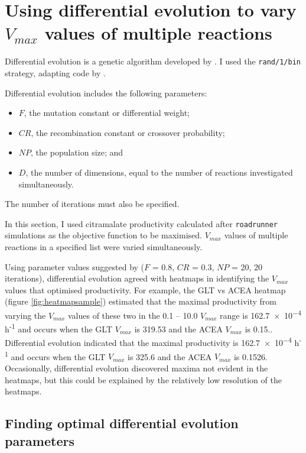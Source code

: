 \documentclass[parskip=full, numbers=noenddot]{scrreprt}
\begin{document}
\section{Using differential evolution to vary $V_{max}$ values of multiple reactions}
\label{sec:de}

Differential evolution is a genetic algorithm developed by \citet{storn_differential_1997}. I used the \texttt{rand/1/bin} strategy, adapting code by \citet{mier_tutorial_2017, mier_small_2017}.

Differential evolution includes the following parameters:
\begin{itemize}
\item $F$, the mutation constant or differential weight;
\item $CR$, the recombination constant or crossover probability;
\item $NP$, the population size; and
  \item $D$, the number of dimensions, equal to the number of reactions investigated simultaneously.
\end{itemize}
The number of iterations must also be specified.

In this section, I used citramalate productivity calculated after \texttt{roadrunner} simulations as the objective function to be maximised. $V_{max}$ values of multiple reactions in a specified list were varied simultaneously.

Using parameter values suggested by \citet{storn_differential_1997} ($F$ = 0.8, $CR$ = 0.3, $NP$ = 20, 20 iterations), differential evolution agreed with heatmaps in identifying the $V_{max}$ values that optimised productivity.
For example, the GLT vs ACEA heatmap (figure \ref{fig:heatmapsample}) estimated that the maximal productivity from varying the $V_{max}$ values of these two in the 0.1 -- 10.0 $V_{max}$ range is \num{162.7e-4} h\textsuperscript{-1} and occurs when the GLT $V_{max}$ is 319.53 and the ACEA $V_{max}$ is 0.15.. Differential evolution indicated that the maximal productivity is \num{162.7e-4} h\textsuperscript{-1} and occurs when the GLT $V_{max}$ is 325.6 and the ACEA $V_{max}$ is 0.1526.
Occasionally, differential evolution discovered maxima not evident in the heatmaps, but this could be explained by the relatively low resolution of the heatmaps. 

\subsection{Finding optimal differential evolution parameters}
\label{ssec:deoptimise}
\end{document}
